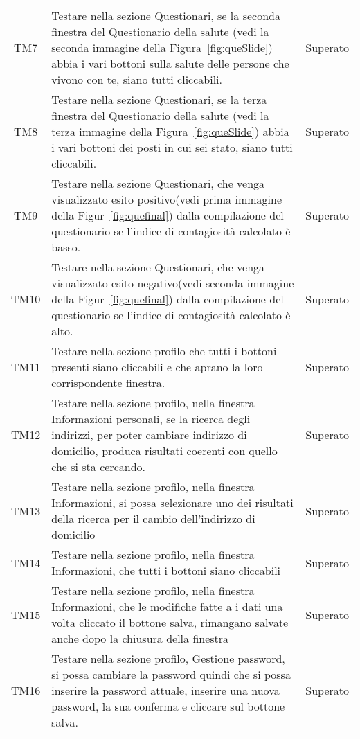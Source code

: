 \begin{table}[h]%
	\centering
	\begin{tabularx}{\textwidth}{c X c}
		\hline	
		\rowcolor{giallo}
		\intest{Codice} &  \intest{Descrizione} & \intest{Esito}\\	
		\hline	
		TM7 & Testare nella sezione Questionari, se la seconda finestra del Questionario della salute (vedi la seconda immagine della Figura~\ref{fig:queSlide}) abbia i vari bottoni sulla salute delle persone che vivono con te, siano tutti cliccabili. & Superato\\
		TM8 & Testare nella sezione Questionari, se la terza finestra del Questionario della salute (vedi la terza immagine della Figura~\ref{fig:queSlide}) abbia i vari bottoni dei posti in cui sei stato, siano tutti cliccabili. & Superato\\
		TM9 & Testare nella sezione Questionari, che venga visualizzato esito positivo(vedi prima immagine della Figur~\ref{fig:quefinal}) dalla compilazione del questionario se l'indice di contagiosità calcolato è basso. & Superato\\
		TM10 & Testare nella sezione Questionari, che venga visualizzato esito negativo(vedi seconda immagine della Figur~\ref{fig:quefinal}) dalla compilazione del questionario se l'indice di contagiosità calcolato è alto. & Superato\\
		TM11 & Testare nella sezione profilo che tutti i bottoni presenti siano cliccabili e che aprano la loro corrispondente finestra. & Superato\\
		TM12 & Testare nella sezione profilo, nella finestra Informazioni personali, se la ricerca degli indirizzi, per poter cambiare indirizzo di domicilio, produca risultati coerenti con quello che si sta cercando. & Superato\\
		TM13 & Testare nella sezione profilo, nella finestra Informazioni, si possa selezionare uno dei risultati della ricerca per il cambio dell'indirizzo di domicilio & Superato\\
		TM14 & Testare nella sezione profilo, nella finestra Informazioni, che tutti i bottoni siano cliccabili & Superato\\
		TM15 & Testare nella sezione profilo, nella finestra Informazioni, che le modifiche fatte a i dati una volta cliccato il bottone salva, rimangano salvate anche dopo la chiusura della finestra & Superato\\
		TM16 & Testare nella sezione profilo, Gestione password, si possa cambiare la password quindi che si possa inserire la password attuale, inserire una nuova password, la sua conferma e cliccare sul bottone salva. & Superato\\

\end{tabularx}
\end{table}
